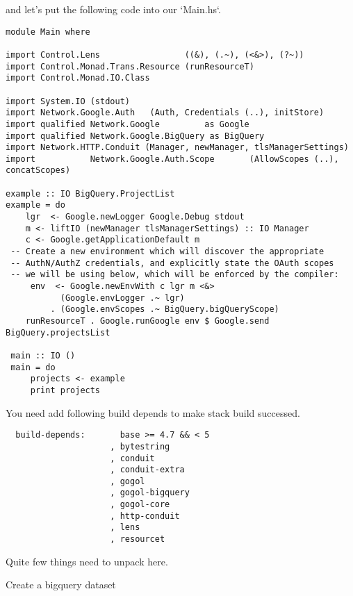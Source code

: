 and let's put the following code into our `Main.hs`.

\begin{verbatim}
module Main where

import Control.Lens                 ((&), (.~), (<&>), (?~))
import Control.Monad.Trans.Resource (runResourceT)
import Control.Monad.IO.Class

import System.IO (stdout)
import Network.Google.Auth   (Auth, Credentials (..), initStore)
import qualified Network.Google         as Google
import qualified Network.Google.BigQuery as BigQuery
import Network.HTTP.Conduit (Manager, newManager, tlsManagerSettings)
import           Network.Google.Auth.Scope       (AllowScopes (..),                                                  concatScopes)

example :: IO BigQuery.ProjectList
example = do
    lgr  <- Google.newLogger Google.Debug stdout
    m <- liftIO (newManager tlsManagerSettings) :: IO Manager
    c <- Google.getApplicationDefault m
 -- Create a new environment which will discover the appropriate
 -- AuthN/AuthZ credentials, and explicitly state the OAuth scopes
 -- we will be using below, which will be enforced by the compiler:
     env  <- Google.newEnvWith c lgr m <&>
           (Google.envLogger .~ lgr)
         . (Google.envScopes .~ BigQuery.bigQueryScope)
    runResourceT . Google.runGoogle env $ Google.send BigQuery.projectsList

 main :: IO ()
 main = do
     projects <- example
     print projects
\end{verbatim}

You need add following build depends to make stack build successed.

\begin{verbatim}
  build-depends:       base >= 4.7 && < 5
                     , bytestring
                     , conduit
                     , conduit-extra
                     , gogol
                     , gogol-bigquery
                     , gogol-core
                     , http-conduit
                     , lens
                     , resourcet
\end{verbatim}

Quite few things need to unpack here.

Create a bigquery dataset


